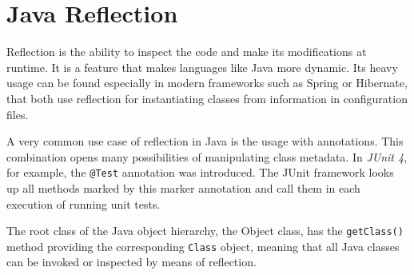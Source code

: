 \documentclass[12pt, oneside, a4paper]{book}
\begin{document}
\section{Java Reflection}

Reflection is the ability to inspect the code and make its modifications at runtime. 
It is a feature that makes languages like Java more dynamic. 
Its heavy usage can be found especially in modern frameworks such as Spring or Hibernate, that both use reflection for instantiating classes from information in configuration files. 

A very common use case of reflection in Java is the usage with annotations. 
This combination opens many possibilities of manipulating class metadata. 
In \textit{JUnit 4}, for example, the \texttt{@Test} annotation was introduced. 
The JUnit framework looks up all methods marked by this marker annotation and call them in each execution of running unit tests.

The root class of the Java object hierarchy, the Object class, has the \texttt{getClass()} method providing the corresponding \texttt{Class} object, meaning that all Java classes can be invoked or inspected by means of reflection.
\end{document}
